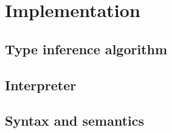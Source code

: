 \chapter{Implementation}
\section{Type inference algorithm}
\section{Interpreter}
\section{Syntax and semantics}